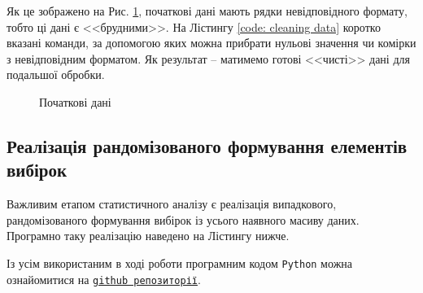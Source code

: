 \newpage


\vspace{0.4cm}
Як це зображено на Рис. \ref{figure: initial data}, початкові дані мають рядки невідповідного формату, 
тобто ці дані є <<брудними>>. На Лістингу \ref{code: cleaning data} коротко вказані команди, за допомогою 
яких можна прибрати нульові значення чи комірки з невідповідним форматом. Як результат -- матимемо готові 
<<чисті>> дані для подальшої обробки. 

\begin{figure}[H]
    \caption{Початкові дані}
    \label{figure: initial data}
\end{figure}



\subsection*{Реалізація рандомізованого формування елементів вибірок}

Важливим етапом статистичного аналізу є реалізація випадкового, рандомізованого формування вибірок із усього 
наявного масиву даних. Програмно таку реалізацію наведено на Лістингу нижче.



\vspace{0.4cm}
Із усім використаним в ході роботи програмним кодом \texttt{Python} можна ознайомитися на  
\href{https://github.com/Arroneq/SA-PYTHON.git}{\texttt{github репозиторії}}.
